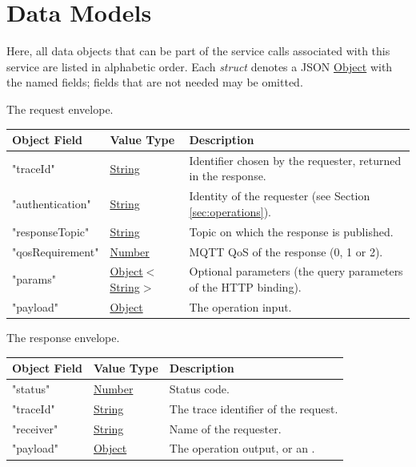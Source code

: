 \documentclass[a4paper]{arrowhead}
\newcommand{\mref}[2][]{{\textcolor{ArrowheadPurple}{\hyperref[sec:model:#2]{\ifstrempty{#1}{#2}{#1}}}}}
\newcommand{\pref}[1]{{\textcolor{ArrowheadGrey}{\hyperref[sec:model:primitives:#1]{#1}}}}
\begin{document}
\newpage

\section{Data Models}
\label{sec:model}

Here, all data objects that can be part of the service calls associated with this service are listed in alphabetic order.
Each \textit{struct} denotes a JSON \pref{Object} with the named fields; fields that are not needed may be omitted.


The request envelope.

\noindent\begin{tabularx}{\textwidth}{| p{4.25cm} | p{3.5cm} | X |} \hline
\rowcolor{gray!33} Object Field & Value Type & Description \\ \hline
"traceId" & \pref{String} & Identifier chosen by the requester, returned in the response. \\ \hline
"authentication" & \pref{String} & Identity of the requester (see Section \ref{sec:operations}). \\ \hline
"responseTopic" & \pref{String} & Topic on which the response is published. \\ \hline
"qosRequirement" & \pref{Number} & MQTT QoS of the response (0, 1 or 2). \\ \hline
"params" & \pref{Object}$<$\pref{String}$>$ & Optional parameters (the query parameters of the HTTP binding). \\ \hline
"payload" & \pref{Object} & The operation input. \\ \hline
\end{tabularx}


The response envelope.

\noindent\begin{tabularx}{\textwidth}{| p{4.25cm} | p{3.5cm} | X |} \hline
\rowcolor{gray!33} Object Field & Value Type & Description \\ \hline
"status" & \pref{Number} & Status code. \\ \hline
"traceId" & \pref{String} & The trace identifier of the request. \\ \hline
"receiver" & \pref{String} & Name of the requester. \\ \hline
"payload" & \pref{Object} & The operation output, or an \mref{ErrorMessage}. \\ \hline
\end{tabularx}
\end{document}
